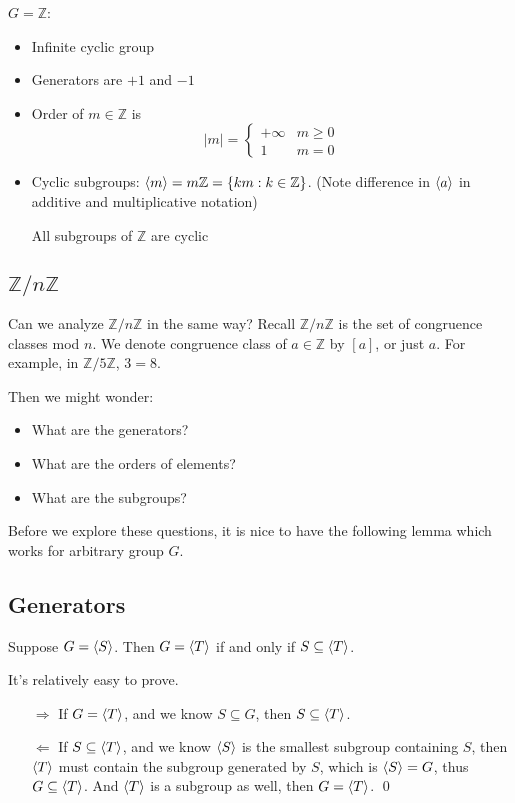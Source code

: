 \begin{ex}[$\mathbb Z$]
$G=\mathbb Z$:
\begin{itemize}
	\item Infinite cyclic group
	\item Generators are $+1$ and $-1$
	\item Order of $m\in\mathbb Z$ is 
	$$
	|m| = \begin{cases}
	+\infty & m\ge 0\\
	1 & m=0
	\end{cases}
	$$
	\item Cyclic subgroups: $\left\langle m \right\rangle = m\mathbb Z = \{km: k\in\mathbb Z\}$. (Note difference in $\left\langle a \right\rangle$ in additive and multiplicative notation)
	
	All subgroups of $\mathbb Z$ are cyclic
\end{itemize}
\end{ex}

\subsection{$\mathbb Z/n\mathbb Z$}
Can we analyze $\mathbb Z/n\mathbb Z$ in the same way? Recall $\mathbb Z/n\mathbb Z$ is the set of congruence classes mod $n$. We denote congruence class of $a\in \mathbb Z$ by $[a]$, or just $a$. For example, in $\mathbb Z/5\mathbb Z$, $3=8$.

Then we might wonder:
\begin{itemize}
	\item What are the generators?
	\item What are the orders of elements?
	\item What are the subgroups?
\end{itemize}


Before we explore these questions, it is nice to have the following lemma which works for arbitrary group $G$.

\subsection*{Generators}

\begin{lemma}
Suppose $G=\left\langle S \right\rangle$. Then $G=\left\langle T \right\rangle$ if and only if $S\subseteq \left\langle T \right\rangle$.
\end{lemma}


\begin{pfno}
It's relatively easy to prove.
\begin{itemize}
	\item[$\Rightarrow$] If $G=\left\langle T \right\rangle$, and we know $S\subseteq G$, then $S\subseteq \left\langle T \right\rangle$.
	\item[$\Leftarrow$] If $S\subseteq \left\langle T \right\rangle$, and we know $\left\langle S \right\rangle$ is the smallest subgroup containing $S$, then $\left\langle T \right\rangle$ must contain the subgroup generated by $S$, which is $\left\langle S \right\rangle=G$, thus $G\subseteq \left\langle T \right\rangle$. And $\left\langle T \right\rangle$ is a subgroup as well, then $G=\left\langle T \right\rangle$. \qed
\end{itemize}
\end{pfno}

